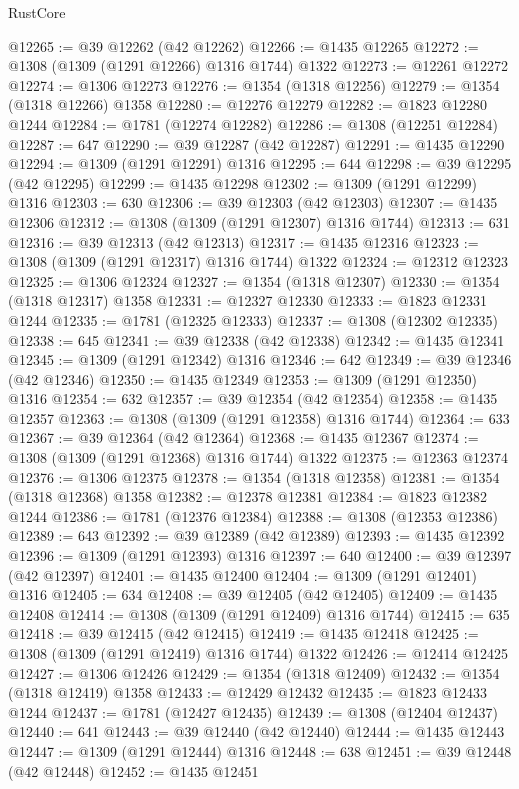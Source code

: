 \begin{lexlean}{RustCore}
\begin{coremodule}
@12265 := @39 @12262 (@42 @12262)
@12266 := @1435 @12265
@12272 := @1308 (@1309 (@1291 @12266) @1316 @1744) @1322
@12273 := @12261 @12272
@12274 := @1306 @12273
@12276 := @1354 (@1318 @12256)
@12279 := @1354 (@1318 @12266) @1358
@12280 := @12276 @12279
@12282 := @1823 @12280 @1244
@12284 := @1781 (@12274 @12282)
@12286 := @1308 (@12251 @12284)
@12287 := 647
@12290 := @39 @12287 (@42 @12287)
@12291 := @1435 @12290
@12294 := @1309 (@1291 @12291) @1316
@12295 := 644
@12298 := @39 @12295 (@42 @12295)
@12299 := @1435 @12298
@12302 := @1309 (@1291 @12299) @1316
@12303 := 630
@12306 := @39 @12303 (@42 @12303)
@12307 := @1435 @12306
@12312 := @1308 (@1309 (@1291 @12307) @1316 @1744)
@12313 := 631
@12316 := @39 @12313 (@42 @12313)
@12317 := @1435 @12316
@12323 := @1308 (@1309 (@1291 @12317) @1316 @1744) @1322
@12324 := @12312 @12323
@12325 := @1306 @12324
@12327 := @1354 (@1318 @12307)
@12330 := @1354 (@1318 @12317) @1358
@12331 := @12327 @12330
@12333 := @1823 @12331 @1244
@12335 := @1781 (@12325 @12333)
@12337 := @1308 (@12302 @12335)
@12338 := 645
@12341 := @39 @12338 (@42 @12338)
@12342 := @1435 @12341
@12345 := @1309 (@1291 @12342) @1316
@12346 := 642
@12349 := @39 @12346 (@42 @12346)
@12350 := @1435 @12349
@12353 := @1309 (@1291 @12350) @1316
@12354 := 632
@12357 := @39 @12354 (@42 @12354)
@12358 := @1435 @12357
@12363 := @1308 (@1309 (@1291 @12358) @1316 @1744)
@12364 := 633
@12367 := @39 @12364 (@42 @12364)
@12368 := @1435 @12367
@12374 := @1308 (@1309 (@1291 @12368) @1316 @1744) @1322
@12375 := @12363 @12374
@12376 := @1306 @12375
@12378 := @1354 (@1318 @12358)
@12381 := @1354 (@1318 @12368) @1358
@12382 := @12378 @12381
@12384 := @1823 @12382 @1244
@12386 := @1781 (@12376 @12384)
@12388 := @1308 (@12353 @12386)
@12389 := 643
@12392 := @39 @12389 (@42 @12389)
@12393 := @1435 @12392
@12396 := @1309 (@1291 @12393) @1316
@12397 := 640
@12400 := @39 @12397 (@42 @12397)
@12401 := @1435 @12400
@12404 := @1309 (@1291 @12401) @1316
@12405 := 634
@12408 := @39 @12405 (@42 @12405)
@12409 := @1435 @12408
@12414 := @1308 (@1309 (@1291 @12409) @1316 @1744)
@12415 := 635
@12418 := @39 @12415 (@42 @12415)
@12419 := @1435 @12418
@12425 := @1308 (@1309 (@1291 @12419) @1316 @1744) @1322
@12426 := @12414 @12425
@12427 := @1306 @12426
@12429 := @1354 (@1318 @12409)
@12432 := @1354 (@1318 @12419) @1358
@12433 := @12429 @12432
@12435 := @1823 @12433 @1244
@12437 := @1781 (@12427 @12435)
@12439 := @1308 (@12404 @12437)
@12440 := 641
@12443 := @39 @12440 (@42 @12440)
@12444 := @1435 @12443
@12447 := @1309 (@1291 @12444) @1316
@12448 := 638
@12451 := @39 @12448 (@42 @12448)
@12452 := @1435 @12451

\end{coremodule}
\end{lexlean}
